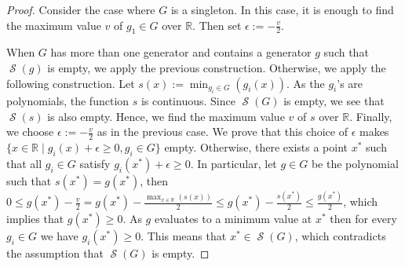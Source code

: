 \documentclass[preprint,12pt,authoryear]{elsarticle}
\newtheorem{proof}[theorem]{Proof}
\DeclareMathOperator{\semialgebraic}{\mathcal{S}}
\begin{document}
\begin{proof}
 Consider the case where $G$ is a singleton. In this case, it is enough
  to find the maximum value $v$ of $g_1 \in G$ over $\mathbb{R}$. Then set
  $\epsilon := -\frac{v}{2}$.

  When $G$ has more than one generator and contains a generator $g$ such that
  $\semialgebraic(g)$ is empty, we apply the previous
  construction. Otherwise, we apply the following construction. Let
  $s(x) := \min_{g_i \in G}(g_i(x))$. As the $g_i$'s are polynomials, the
  function $s$ is continuous. Since $\semialgebraic(G)$ is empty, we see that
 $\semialgebraic(s)$ is also empty. Hence, we find the maximum value $v$ of $s$
  over $\mathbb{R}$. Finally, we choose $\epsilon := -\frac{v}{2}$ as in the
  previous case. We prove that this choice of $\epsilon$ makes
  $\{x \in \mathbb{R} \mid g_i(x) + \epsilon \geq 0, g_i \in G\}$
  empty. Otherwise, there exists a point $x^{*}$ such that all $g_i \in G$
  satisfy $g_i(x^{*}) + \epsilon \geq 0$. In particular, let $g \in G$ be the
  polynomial such that $s(x^{*}) = g(x^{*})$, then
  $0 \leq g(x^{*}) - \frac{v}{2} = g(x^{*}) - \frac{\max_{x \in
      \mathbb{R}}(s(x))}{2} \leq g(x^{*}) - \frac{s(x^{*})}{2} \leq
  \frac{g(x^{*})}{2}$, which implies that $g(x^{*}) \geq 0$. As $g$ evaluates to
  a minimum value at $x^{*}$ then for every $g_i \in G$ we have $g_i(x^{*}) \geq
  0$. This means that $x^{*} \in \semialgebraic(G)$, which contradicts the
  assumption that $\semialgebraic(G)$ is empty.
\end{proof}
\end{document}
